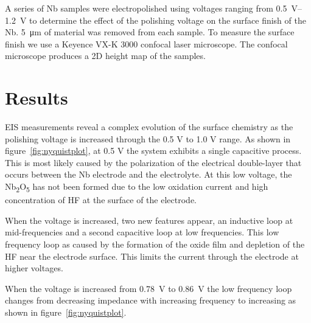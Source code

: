 A series of Nb samples were electropolished using voltages ranging from \qtyrange{0.5}{1.2}{\volt} to determine the effect of the polishing voltage on the surface finish of the Nb. \qty{5}{\micro\meter} of material was removed from each sample. To measure the surface finish we use a  Keyence VX-K 3000 confocal laser microscope. The confocal microscope produces a 2D height map of the samples.



\section{Results}
\label{sec:org4a45003}

EIS measurements reveal a complex evolution of the surface chemistry as the polishing voltage is increased through the 0.5 V to 1.0 V range. As shown in figure~\ref{fig:nyquistplot}, at 0.5 V the system exhibits a single capacitive process. This is most likely caused by the polarization of the electrical double-layer that occurs between the Nb electrode and the electrolyte. At this low voltage, the Nb\textsubscript{2}O\textsubscript{5} has not been formed due to the low oxidation current and high concentration of HF at the surface of the electrode.

When the voltage is increased, two new features appear, an inductive loop at mid-frequencies and a second capacitive loop at low frequencies. This low frequency loop as caused by the formation of the oxide film and depletion of the HF near the electrode surface. This limits the current through the electrode at higher voltages. 

When the voltage is increased from \qty{0.78}{\volt} to \qty{0.86}{\volt} the low frequency loop changes from decreasing impedance with increasing frequency to increasing as shown in figure~\ref{fig:nyquistplot}.

